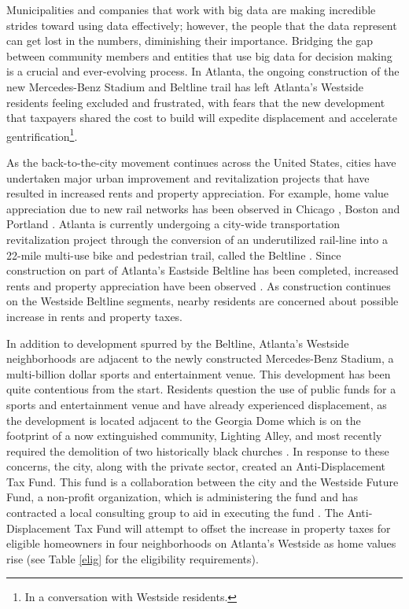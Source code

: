 \documentclass{acm_proc_article-sp}
\begin{document}
Municipalities and companies that work with big data are making incredible strides toward using data effectively; however, the people that the data represent can get lost in the numbers, diminishing their importance. Bridging the gap between community members and entities that use big data for decision making is a crucial and ever-evolving process. In Atlanta, the ongoing construction of the new Mercedes-Benz Stadium and Beltline trail has left Atlanta's Westside residents feeling excluded and frustrated, with fears that the new development that taxpayers shared the cost to build will expedite displacement and accelerate gentrification\footnote{In a conversation with Westside residents.}.

As the back-to-the-city movement continues across the United States, cities have undertaken major urban improvement and revitalization projects that have resulted in increased rents and property appreciation. For example, home value appreciation due to new rail networks has been observed in Chicago \cite{mcm04}, Boston \cite{arms94} and Portland \cite{chen98}. Atlanta is currently undergoing a city-wide transportation revitalization project through the conversion of an underutilized rail-line into a 22-mile multi-use bike and pedestrian trail, called the Beltline \cite{atlblt17}. Since construction on part of Atlanta's Eastside Beltline has been completed, increased rents and property appreciation have been observed \cite{imm09}. As construction continues on the Westside Beltline segments, nearby residents are concerned about possible increase in rents and property taxes.

In addition to development spurred by the Beltline, Atlanta's Westside neighborhoods are adjacent to the newly constructed Mercedes-Benz Stadium, a multi-billion dollar sports and entertainment venue. This development has been quite contentious from the start. Residents question the use of public funds for a sports and entertainment venue and have already experienced displacement, as the development is located adjacent to the Georgia Dome which is on the footprint of a now extinguished community, Lighting Alley, and most recently required the demolition of two historically black churches \cite{bels17}. In response to these concerns, the city, along with the private sector, created an Anti-Displacement Tax Fund. This fund is a collaboration between the city and the Westside Future Fund, a non-profit organization, which is administering the fund and has contracted a local consulting group to aid in executing the fund \cite{wsff17b}. The Anti-Displacement Tax Fund will attempt to offset the increase in property taxes for eligible homeowners in four neighborhoods on Atlanta's Westside as home values rise (see Table \ref{elig} for the eligibility requirements).
\end{document}
